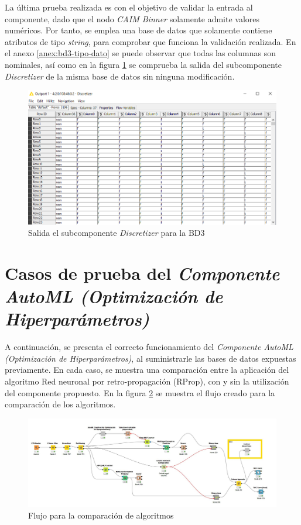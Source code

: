 La última prueba realizada es con el objetivo de validar la entrada al componente, dado que el nodo \textit{CAIM Binner} solamente admite valores numéricos. Por tanto, se emplea una base de datos que solamente contiene atributos de tipo \textit{string}, para comprobar que funciona la validación realizada. En el anexo \ref{anex:bd3-tipo-dato} se puede observar que todas las columnas son nominales, así como en la figura \ref{fig:bd-krvskp-salida} se comprueba la salida del subcomponente \textit{Discretizer} de la misma base de datos sin ninguna modificación.

\begin{figure}[H]
	\centering
	\includegraphics[width=0.7\linewidth]{"figuras/capi 3/pruebas-jenn/bd-kr_vs_kp-salida"}
	\caption{Salida el subcomponente \textit{Discretizer} para la BD3}
	\label{fig:bd-krvskp-salida}
\end{figure}

\section{Casos de prueba del \textit{Componente AutoML (Optimización de Hiperparámetros)}}
A continuación, se presenta el correcto funcionamiento del \textit{Componente AutoML (Optimización de Hiperparámetros)}, al suministrarle las bases de datos expuestas previamente. En cada caso, se muestra una comparación entre la aplicación del algoritmo Red neuronal por retro-propagación (RProp), con y sin la utilización del componente propuesto. En la figura \ref{fig:flujo-comp-algoritmos-hpo} se muestra el flujo creado para la comparación de los algoritmos.

\begin{figure}[H]
	\centering
	\includegraphics[width=0.7\linewidth]{"figuras/capi 3/pruebas-ray/flujo-comp-algoritmos-hpo"}
	\caption{Flujo para la comparación de algoritmos}
	\label{fig:flujo-comp-algoritmos-hpo}
\end{figure}

